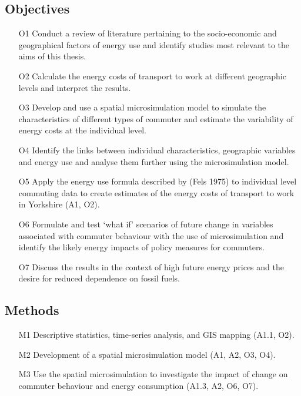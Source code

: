 \subsection{Objectives}
\begin{itemize}
 \item[O1] Conduct a review of literature pertaining to the socio-economic and
geographical factors of
energy use and identify studies most relevant to the aims of this thesis.
  \item[O2]Calculate the energy costs of transport to work at different
geographic levels and interpret the results.
  \item[O3]Develop and use a spatial microsimulation model to simulate the
characteristics of different types of commuter and estimate the variability of
energy costs at the individual level.
  \item[O4] Identify the links between individual characteristics, geographic
variables and energy use
and analyse them further using the microsimulation model.
  \item[O5]Apply the energy use formula described by (Fels 1975) to individual
level commuting data to create estimates of the energy costs of transport to
work in Yorkshire (A1, O2).
  \item[O6] Formulate and test `what if' scenarios of future change in
variables
associated with commuter behaviour with the use of microsimulation and identify
the likely energy impacts of policy measures for commuters.
  \item[O7]Discuss the results in the context of high future energy prices and
the desire for reduced dependence on fossil fuels.
\end{itemize}

\subsection{Methods}
\begin{itemize}
 \item[M1] Descriptive statistics, time-series analysis, and GIS mapping (A1.1,
O2).
\item[M2]Development of a spatial microsimulation model (A1, A2, O3, O4).
\item[M3]Use the spatial microsimulation to investigate the impact of
change on commuter behaviour and energy consumption (A1.3, A2, O6, O7).
\end{itemize}







